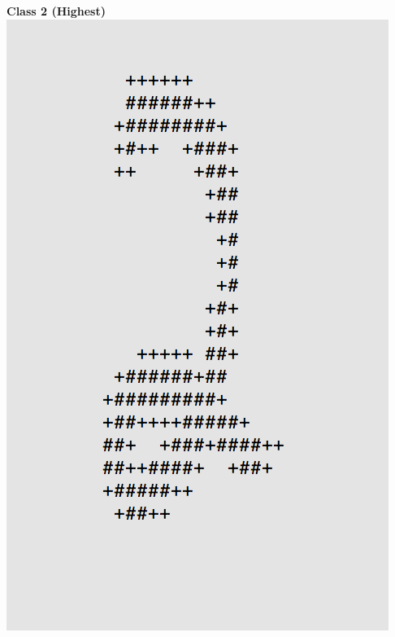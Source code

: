 \documentclass[11pt]{article}
\begin{document}
\begin{center}
\begin{multicols}{2}
\textbf{Class 2 (Highest)}\\
\includegraphics[scale=0.4]{part1/1/high_2.png}


\end{multicols}
\end{center}
\end{document}
